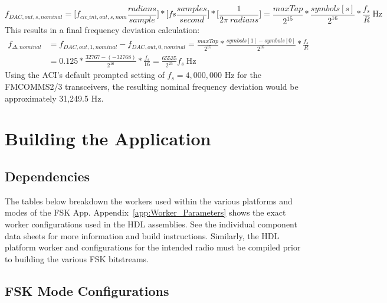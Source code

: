 	\begin{equation} \label{eq:output_freq_0}
		f_{DAC,out,s,nominal} = \Bigg[ f_{cic\_int,out,s,nom} \frac{radians}{sample} \Bigg] * \Bigg[ fs \frac{samples}{second} \Bigg] * \Bigg[ \frac{1}{2\pi \ radians} \Bigg] = \frac{maxTap}{2^{15}} * \frac{symbols[s]}{2^{16}} * \frac{f_s}{R} \ \text{Hz}
	\end{equation}
This results in a final frequency deviation calculation:
	\begin{align*} \label{eq:freq_deviation}
		f_{\Delta,nominal} &= f_{DAC,out,1,nominal} - f_{DAC,out,0,nominal}
		= \frac{maxTap}{2^{15}} * \frac{symbols[1]-symbols[0]}{2^{16}} * \frac{f_s}{R} \\
		&= 0.125 * \frac{32767 - (-32768)}{2^{16}} * \frac{f_s}{16}
		= \frac{65535}{2^{23}} f_s \ \text{Hz}
	\end{align*}
Using the ACI's default prompted setting of $f_s=4,000,000$ Hz for the FMCOMMS2/3 transceivers, the resulting nominal frequency deviation would be approximately 31,249.5 Hz.

\newpage
\section{Building the Application}
\subsection{Dependencies}
\noindent The tables below breakdown the workers used within the various platforms and modes of the FSK App. Appendix~\ref{app:Worker_Parameters} shows the exact worker configurations used in the HDL assemblies. See the individual component data sheets for more information and build instructions. Similarly, the HDL platform worker and configurations for the intended radio must be compiled prior to building the various FSK bitstreams.
\subsection{FSK Mode Configurations}
